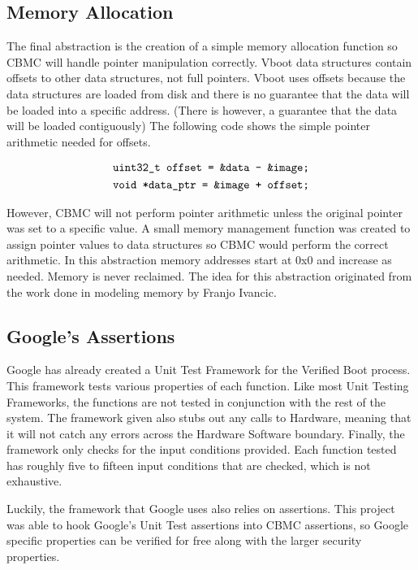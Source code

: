 \subsection{Memory Allocation}

The final abstraction is the creation of a simple memory allocation function so
CBMC will handle pointer manipulation correctly.
Vboot data structures contain offsets to other data structures, not full
pointers. 
Vboot uses offsets because the data structures are loaded from disk and there is
no guarantee that the data will be loaded into a specific address.
(There is however, a guarantee that the data will be loaded contiguously)
The following code shows the simple pointer arithmetic needed for offsets.

\begin{equation} \label{eq:ptr}
\begin{split}
    \texttt{uint32\_t offset = \&data - \&image;} \\
    \texttt{void *data\_ptr = \&image + offset;} 
\end{split}
\end{equation}

However, CBMC will not perform pointer arithmetic unless the original pointer
was set to a specific value.
A small memory management function was created to assign pointer values to data
structures so CBMC would perform the correct arithmetic.
In this abstraction memory addresses start at 0x0 and increase as needed.
Memory is never reclaimed.
The idea for this abstraction originated from the work done in modeling memory
by Franjo Ivancic\cite{eff-model-check}.

\subsection{Google's Assertions}

Google has already created a Unit Test Framework for the Verified Boot process.
This framework tests various properties of each function.
Like most Unit Testing Frameworks, the functions are not tested in conjunction
with the rest of the system.
The framework given also stubs out any calls to Hardware, meaning that it 
will not catch any errors across the Hardware Software boundary.
Finally, the framework only checks for the input conditions provided. 
Each function tested has roughly five to fifteen input conditions that are
checked, which is not exhaustive.

Luckily, the framework that Google uses also relies on assertions.
This project was able to hook Google's Unit Test assertions into CBMC
assertions, so Google specific properties can be verified for free along with 
the larger security properties. 

